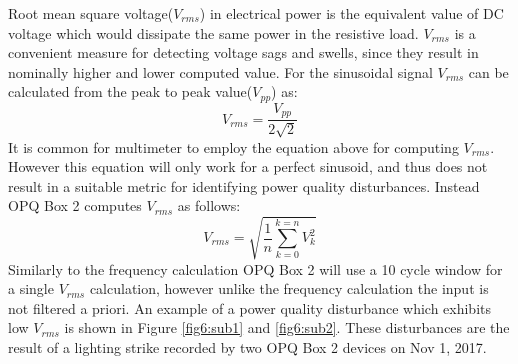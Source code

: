 Root mean square voltage($V_{rms}$) in electrical power is the equivalent value of DC voltage which would dissipate the same power in the resistive load. $V_{rms}$ is a convenient measure for detecting voltage sags and swells, since they result in nominally higher and lower computed value. For the sinusoidal signal $V_{rms}$ can be calculated from the peak to peak value($V_{pp}$) as:
\begin{equation} \label{eq:2}
	V_{rms} = \frac{V_{pp}}{2\sqrt{2}}
\end{equation}
It is common for multimeter to employ the equation above for computing $V_{rms}$. However this equation will only work for a perfect sinusoid, and thus does not result in a suitable metric for identifying power quality disturbances. Instead OPQ Box 2 computes $V_{rms}$ as follows:
\begin{equation} \label{eq:3}
	V_{rms} = \sqrt{\frac{1}{n}\sum\limits_{k=0}^{k=n}V_{k}^{2}}
\end{equation}
Similarly to the frequency calculation OPQ Box 2 will use a 10 cycle window for a single $V_{rms}$ calculation, however unlike the frequency calculation the input is not filtered a priori. An example of a power quality disturbance which exhibits low $V_{rms}$ is shown in Figure \ref{fig6:sub1} and \ref{fig6:sub2}. These disturbances are the result of a lighting strike recorded by two OPQ Box 2 devices on Nov 1, 2017.

